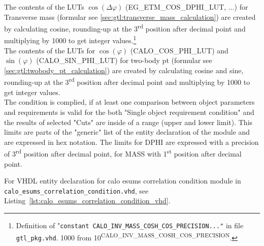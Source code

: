 The contents of the LUTs $\cos(\Delta\varphi)$ (\small{EG\_ETM\_COS\_DPHI\_LUT}\normalsize, ...) for Transverse mass (formular see \ref{sec:gtl:transverse_mass_calculation}) 
are created by calculating cosine, rounding-up at the 3\textsuperscript{rd}
position after decimal point and multiplying by 1000 to get integer values.\footnote{Definition of "\texttt{constant \small{CALO\_INV\_MASS\_COSH\_COS\_PRECISION}\normalsize ..."} in file \texttt{gtl\_pkg.vhd}.
1000 from 10\textsuperscript{\tiny{CALO\_INV\_MASS\_COSH\_COS\_PRECISION}}\normalsize.}\\
The contents of the LUTs for $\cos(\varphi)$ (\small{CALO\_COS\_PHI\_LUT}\normalsize) and $\sin(\varphi)$ (\small{CALO\_SIN\_PHI\_LUT}\normalsize) for two-body pt 
(formular see \ref{sec:gtl:twobody_pt_calculation}) are created by calculating cosine and sine, rounding-up at the 3\textsuperscript{rd} position after decimal point and multiplying by 1000 to get integer values.\\
The condition is complied, if at least one comparison between object parameters and requirements is valid for the both "Single object requirement condition"
and the results of selected "Cuts" are inside of a range (upper and lower limit).
This limits are parts of the "generic" list of the entity declaration of the module and are expressed in hex notation. The limits for DPHI
are expressed with a precision of 3\textsuperscript{rd} position after decimal point, for MASS with 1\textsuperscript{st} position after decimal point.

For VHDL entity declaration for calo esums correlation condition module in \texttt{calo\_esums\_correlation\_condition.vhd}, see Listing~\ref{lst:calo_esums_correlation_condition_vhd}.\\


\clearpage


